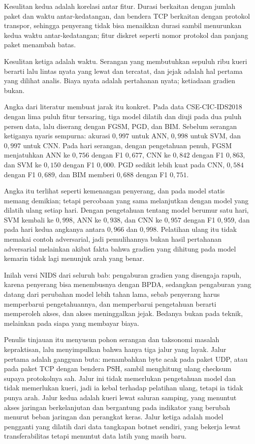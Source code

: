 Kesulitan kedua adalah korelasi antar fitur. Durasi berkaitan dengan jumlah paket dan
waktu antar-kedatangan, dan bendera TCP berkaitan dengan protokol transpor, sehingga
penyerang tidak bisa menaikkan durasi sambil menurunkan kedua waktu antar-kedatangan;
fitur diskret seperti nomor protokol dan panjang paket menambah batas.

Kesulitan ketiga adalah waktu. Serangan yang membutuhkan sepuluh ribu kueri berarti lalu
lintas nyata yang lewat dan tercatat, dan jejak adalah hal pertama yang dilihat analis.
Biaya nyata adalah pertahanan nyata; ketiadaan gradien bukan.

Angka dari literatur membuat jarak itu konkret. Pada data CSE-CIC-IDS2018 dengan lima
puluh fitur tersaring, tiga model dilatih dan diuji pada dua puluh persen data, lalu
diserang dengan FGSM, PGD, dan BIM. Sebelum serangan ketiganya nyaris sempurna: akurasi
$0{,}997$ untuk ANN, $0{,}998$ untuk SVM, dan $0{,}997$ untuk CNN. Pada hari serangan,
dengan pengetahuan penuh, FGSM menjatuhkan ANN ke $0{,}756$ dengan F1 $0{,}677$, CNN ke
$0{,}842$ dengan F1 $0{,}863$, dan SVM ke $0{,}150$ dengan F1 $0{,}000$. PGD sedikit
lebih kuat pada CNN, $0{,}584$ dengan F1 $0{,}689$, dan BIM memberi $0{,}688$ dengan F1
$0{,}751$.

Angka itu terlihat seperti kemenangan penyerang, dan pada model statis memang demikian;
tetapi percobaan yang sama melanjutkan dengan model yang dilatih ulang setiap hari.
Dengan pengetahuan tentang model berumur satu hari, SVM kembali ke $0{,}998$, ANN ke
$0{,}938$, dan CNN ke $0{,}957$ dengan F1 $0{,}959$, dan pada hari kedua angkanya antara
$0{,}966$ dan $0{,}998$. Pelatihan ulang itu tidak memakai contoh adversarial, jadi
pemulihannya bukan hasil pertahanan adversarial melainkan akibat fakta bahwa gradien yang
dihitung pada model kemarin tidak lagi menunjuk arah yang benar.

Inilah versi NIDS dari seluruh bab: pengaburan gradien yang disengaja rapuh, karena
penyerang bisa menembusnya dengan BPDA, sedangkan pengaburan yang datang dari perubahan
model lebih tahan lama, sebab penyerang harus memperbarui pengetahuannya, dan memperbarui
pengetahuan berarti memperoleh akses, dan akses meninggalkan jejak. Bedanya bukan pada
teknik, melainkan pada siapa yang membayar biaya.

Penulis tinjauan itu menyusun pohon serangan dan taksonomi masalah kepraktisan, lalu
menyimpulkan bahwa hanya tiga jalur yang layak. Jalur pertama adalah gangguan buta:
menambahkan byte acak pada paket UDP, atau pada paket TCP dengan bendera PSH, sambil
menghitung ulang checksum supaya protokolnya sah. Jalur ini tidak memerlukan pengetahuan
model dan tidak memerlukan kueri, jadi ia kebal terhadap pelatihan ulang, tetapi ia tidak
punya arah. Jalur kedua adalah kueri lewat saluran samping, yang menuntut akses jaringan
berkelanjutan dan bergantung pada indikator yang berubah menurut beban jaringan dan
perangkat keras. Jalur ketiga adalah model pengganti yang dilatih dari data tangkapan
botnet sendiri, yang bekerja lewat transferabilitas tetapi menuntut data latih yang masih
baru.

